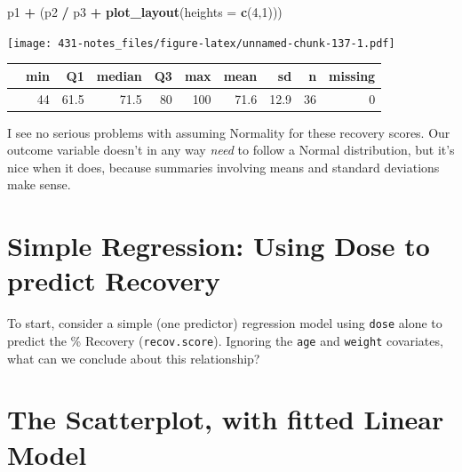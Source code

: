 \documentclass[
]{book}
\newenvironment{Shaded}{\begin{snugshade}}{\end{snugshade}}
\newcommand{\DataTypeTok}[1]{\textcolor[rgb]{0.13,0.29,0.53}{#1}}
\newcommand{\DecValTok}[1]{\textcolor[rgb]{0.00,0.00,0.81}{#1}}
\newcommand{\KeywordTok}[1]{\textcolor[rgb]{0.13,0.29,0.53}{\textbf{#1}}}
\newcommand{\NormalTok}[1]{#1}
\newcommand{\OperatorTok}[1]{\textcolor[rgb]{0.81,0.36,0.00}{\textbf{#1}}}
\newcommand{\StringTok}[1]{\textcolor[rgb]{0.31,0.60,0.02}{#1}}
\begin{document}
\begin{Shaded}
\begin{Highlighting}[]
\NormalTok{p1 }\OperatorTok{+}\StringTok{ }\NormalTok{(p2 }\OperatorTok{/}\StringTok{ }\NormalTok{p3 }\OperatorTok{+}\StringTok{ }\KeywordTok{plot_layout}\NormalTok{(}\DataTypeTok{heights =} \KeywordTok{c}\NormalTok{(}\DecValTok{4}\NormalTok{,}\DecValTok{1}\NormalTok{)))}
\end{Highlighting}
\end{Shaded}

\texttt{[image: 431-notes\_files/figure-latex/unnamed-chunk-137-1.pdf]}

\begin{Shaded}
\end{Shaded}

\begin{tabular}{l|r|r|r|r|r|r|r|r|r}
\hline
  & min & Q1 & median & Q3 & max & mean & sd & n & missing\\
\hline
 & 44 & 61.5 & 71.5 & 80 & 100 & 71.6 & 12.9 & 36 & 0\\
\hline
\end{tabular}

I see no serious problems with assuming Normality for these recovery scores. Our outcome variable doesn't in any way \emph{need} to follow a Normal distribution, but it's nice when it does, because summaries involving means and standard deviations make sense.

\hypertarget{simple-regression-using-dose-to-predict-recovery}{%
\section{Simple Regression: Using Dose to predict Recovery}\label{simple-regression-using-dose-to-predict-recovery}}

To start, consider a simple (one predictor) regression model using \texttt{dose} alone to predict the \% Recovery (\texttt{recov.score}). Ignoring the \texttt{age} and \texttt{weight} covariates, what can we conclude about this relationship?

\hypertarget{the-scatterplot-with-fitted-linear-model}{%
\section{The Scatterplot, with fitted Linear Model}\label{the-scatterplot-with-fitted-linear-model}}
\end{document}
